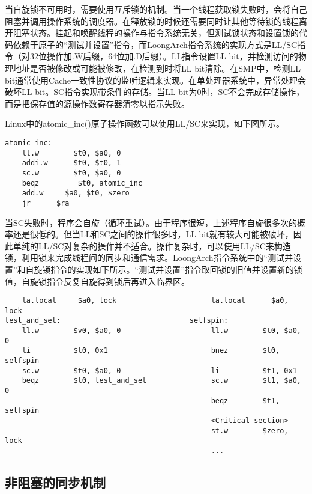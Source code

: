 \documentclass[]{ctexbook}
\begin{document}
当自旋锁不可用时，需要使用互斥锁的机制。当一个线程获取锁失败时，会将自己阻塞并调用操作系统的调度器。在释放锁的时候还需要同时让其他等待锁的线程离开阻塞状态。挂起和唤醒线程的操作与指令系统无关，但测试锁状态和设置锁的代码依赖于原子的``测试并设置''指令，而LoongArch指令系统的实现方式是LL/SC指令（对32位操作加.W后缀，64位加.D后缀）。LL指令设置LL bit，并检测访问的物理地址是否被修改或可能被修改，在检测到时将LL bit清除。在SMP中，检测LL bit通常使用Cache一致性协议的监听逻辑来实现。在单处理器系统中，异常处理会破坏LL bit。SC指令实现带条件的存储。当LL bit为0时，SC不会完成存储操作，而是把保存值的源操作数寄存器清零以指示失败。

Linux中的atomic\_inc()原子操作函数可以使用LL/SC来实现，如下图所示。

\begin{verbatim}
atomic_inc:
    ll.w        $t0, $a0, 0
    addi.w      $t0, $t0, 1
    sc.w        $t0, $a0, 0
    beqz         $t0, atomic_inc
    add.w     $a0, $t0, $zero
    jr      $ra
\end{verbatim}

当SC失败时，程序会自旋（循环重试）。由于程序很短，上述程序自旋很多次的概率还是很低的。但当LL和SC之间的操作很多时，LL bit就有较大可能被破坏，因此单纯的LL/SC对复杂的操作并不适合。操作复杂时，可以使用LL/SC来构造锁，利用锁来完成线程间的同步和通信需求。LoongArch指令系统中的``测试并设置''和自旋锁指令的实现如下所示。``测试并设置''指令取回锁的旧值并设置新的锁值，自旋锁指令反复自旋得到锁后再进入临界区。

\begin{verbatim}
    la.local     $a0, lock                      la.local      $a0, lock
test_and_set:                              selfspin:
    ll.w        $v0, $a0, 0                     ll.w        $t0, $a0, 0
    li          $t0, 0x1                        bnez        $t0, selfspin
    sc.w        $t0, $a0, 0                     li          $t1, 0x1
    beqz        $t0, test_and_set               sc.w        $t1, $a0, 0
                                                beqz        $t1, selfspin
                                                <Critical section>
                                                st.w        $zero, lock
                                                ...
\end{verbatim}

\hypertarget{ux975eux963bux585eux7684ux540cux6b65ux673aux5236}{%
\subsection{非阻塞的同步机制}\label{ux975eux963bux585eux7684ux540cux6b65ux673aux5236}}
\end{document}
